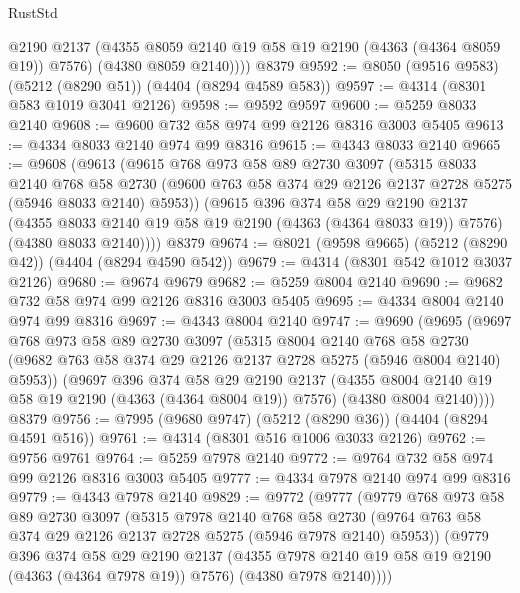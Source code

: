 \begin{lexlean}{RustStd}
\begin{coremodule}
{\begin{coremodule}
{{{{{{{{{{{{{{{{          @2190
          @2137
          (@4355 @8059 @2140 @19 @58 @19 @2190 (@4363 (@4364 @8059 @19)) @7576)
          (@4380 @8059 @2140))))
    @8379
@9592 := @8050 (@9516 @9583) (@5212 (@8290 @51)) (@4404 (@8294 @4589 @583))
@9597 := @4314 (@8301 @583 @1019 @3041 @2126)
@9598 := @9592 @9597
@9600 := @5259 @8033 @2140
@9608 := @9600 @732 @58 @974 @99 @2126 @8316 @3003 @5405
@9613 := @4334 @8033 @2140 @974 @99 @8316
@9615 := @4343 @8033 @2140
@9665 := @9608
    (@9613
      (@9615
        @768
        @973
        @58
        @89
        @2730
        @3097
        (@5315
          @8033
          @2140
          @768
          @58
          @2730
          (@9600 @763 @58 @374 @29 @2126 @2137 @2728 @5275 (@5946 @8033 @2140) @5953))
        (@9615
          @396
          @374
          @58
          @29
          @2190
          @2137
          (@4355 @8033 @2140 @19 @58 @19 @2190 (@4363 (@4364 @8033 @19)) @7576)
          (@4380 @8033 @2140))))
    @8379
@9674 := @8021 (@9598 @9665) (@5212 (@8290 @42)) (@4404 (@8294 @4590 @542))
@9679 := @4314 (@8301 @542 @1012 @3037 @2126)
@9680 := @9674 @9679
@9682 := @5259 @8004 @2140
@9690 := @9682 @732 @58 @974 @99 @2126 @8316 @3003 @5405
@9695 := @4334 @8004 @2140 @974 @99 @8316
@9697 := @4343 @8004 @2140
@9747 := @9690
    (@9695
      (@9697
        @768
        @973
        @58
        @89
        @2730
        @3097
        (@5315
          @8004
          @2140
          @768
          @58
          @2730
          (@9682 @763 @58 @374 @29 @2126 @2137 @2728 @5275 (@5946 @8004 @2140) @5953))
        (@9697
          @396
          @374
          @58
          @29
          @2190
          @2137
          (@4355 @8004 @2140 @19 @58 @19 @2190 (@4363 (@4364 @8004 @19)) @7576)
          (@4380 @8004 @2140))))
    @8379
@9756 := @7995 (@9680 @9747) (@5212 (@8290 @36)) (@4404 (@8294 @4591 @516))
@9761 := @4314 (@8301 @516 @1006 @3033 @2126)
@9762 := @9756 @9761
@9764 := @5259 @7978 @2140
@9772 := @9764 @732 @58 @974 @99 @2126 @8316 @3003 @5405
@9777 := @4334 @7978 @2140 @974 @99 @8316
@9779 := @4343 @7978 @2140
@9829 := @9772
    (@9777
      (@9779
        @768
        @973
        @58
        @89
        @2730
        @3097
        (@5315
          @7978
          @2140
          @768
          @58
          @2730
          (@9764 @763 @58 @374 @29 @2126 @2137 @2728 @5275 (@5946 @7978 @2140) @5953))
        (@9779
          @396
          @374
          @58
          @29
          @2190
          @2137
          (@4355 @7978 @2140 @19 @58 @19 @2190 (@4363 (@4364 @7978 @19)) @7576)
          (@4380 @7978 @2140))))
}}}}}}}}}}}}}}}}
\end{coremodule}}
\end{coremodule}
\end{lexlean}
